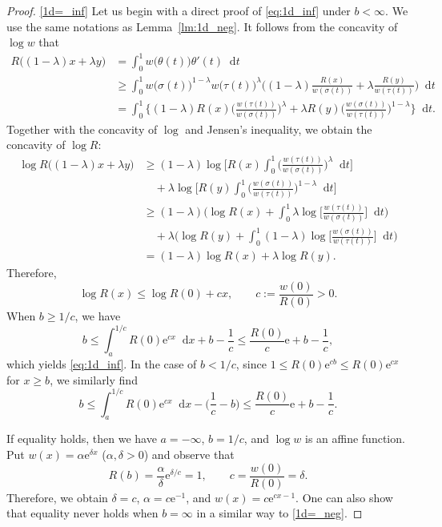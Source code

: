 \documentclass[10pt,a4paper]{amsart}
\newcommand*\diff{\mathop{}\!\mathrm{d}}
\newcommand{\e}{\mathrm{e}}
\begin{document}
\begin{proof}
\eqref{1d=_inf}
Let us begin with a direct proof of \eqref{eq:1d_inf} under $b<\infty$.
We use the same notations as Lemma~\ref{lm:1d_neg}.
It follows from the concavity of $\log w$ that
\begin{align*}
R\bigl( (1-\lambda)x +\lambda y \bigr)
&= \int_0^1 w\bigl( \theta(t) \bigr) \theta'(t) \diff t \\
&\ge \int_0^1 w\bigl( \sigma(t) \bigr)^{1-\lambda} w\bigl( \tau(t) \bigr)^{\lambda}
 \biggl( (1-\lambda) \frac{R(x)}{w(\sigma(t))} +\lambda \frac{R(y)}{w(\tau(t))} \biggr) \diff t \\
&= \int_0^1 \biggl\{ (1-\lambda) R(x) \biggl( \frac{w(\tau(t))}{w(\sigma(t))} \biggr)^{\lambda}
 +\lambda R(y) \biggl( \frac{w(\sigma(t))}{w(\tau(t))} \biggr)^{1-\lambda} \biggr\} \diff t.
\end{align*}
Together with the concavity of $\log$ and Jensen's inequality, we obtain the concavity of $\log R$:
\begin{align*}
\log R\bigl( (1-\lambda)x +\lambda y \bigr)
&\ge (1-\lambda) \log\biggl[ R(x) \int_0^1 \biggl( \frac{w(\tau(t))}{w(\sigma(t))} \biggr)^{\lambda} \diff t \biggr] \\
&\quad +\lambda \log\biggl[ R(y) \int_0^1 \biggl( \frac{w(\sigma(t))}{w(\tau(t))} \biggr)^{1-\lambda} \diff t \biggr] \\
&\ge (1-\lambda) \biggl( \log R(x) +\int_0^1 \lambda \log\biggl[ \frac{w(\tau(t))}{w(\sigma(t))} \biggr] \diff t \biggr) \\
&\quad +\lambda \biggl( \log R(y) +\int_0^1 (1-\lambda) \log\biggl[ \frac{w(\sigma(t))}{w(\tau(t))} \biggr] \diff t \biggr) \\
&= (1-\lambda) \log R(x) +\lambda \log R(y).
\end{align*}
Therefore,
\[ \log R(x) \le \log R(0) +cx, \qquad c:=\frac{w(0)}{R(0)}>0. \]
When $b \ge 1/c$, we have
\[
b \le \int_a^{1/c} R(0) \e^{cx} \diff x +b-\frac{1}{c}
 \le \frac{R(0)}{c} \e +b-\frac{1}{c},
\]
which yields \eqref{eq:1d_inf}.
In the case of $b<1/c$, since $1 \le R(0) \e^{cb} \le R(0) \e^{cx}$ for $x \ge b$,
we similarly find
\[
b \le \int_a^{1/c} R(0) \e^{cx} \diff x -\biggl( \frac{1}{c}-b \biggr)
 \le \frac{R(0)}{c} \e +b-\frac{1}{c}.
\]

If equality holds, then we have $a=-\infty$, $b=1/c$, and $\log w$ is an affine function.
Put $w(x) =\alpha \e^{\delta x}$ ($\alpha,\delta>0$) and observe that
\[ R(b) =\frac{\alpha}{\delta}\e^{\delta/c} =1, \qquad
 c =\frac{w(0)}{R(0)} =\delta. \]
Therefore, we obtain $\delta=c$, $\alpha=c\e^{-1}$, and $w(x)=c\e^{cx-1}$.
One can also show that equality never holds when $b=\infty$ in a similar way to \eqref{1d=_neg}.
\end{proof}
\end{document}
